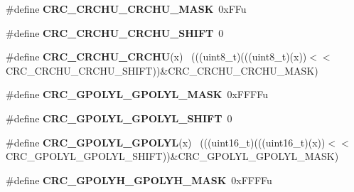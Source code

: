 \begin{DoxyCompactItemize}
\item 
\hypertarget{group___c_r_c___register___masks_ga60c0e02d3f331ed438bce87051649186}{}\#define {\bfseries C\+R\+C\+\_\+\+C\+R\+C\+H\+U\+\_\+\+C\+R\+C\+H\+U\+\_\+\+M\+A\+S\+K}~0x\+F\+Fu\label{group___c_r_c___register___masks_ga60c0e02d3f331ed438bce87051649186}

\item 
\hypertarget{group___c_r_c___register___masks_ga90800aefc9bc2279fa16af913bbbc634}{}\#define {\bfseries C\+R\+C\+\_\+\+C\+R\+C\+H\+U\+\_\+\+C\+R\+C\+H\+U\+\_\+\+S\+H\+I\+F\+T}~0\label{group___c_r_c___register___masks_ga90800aefc9bc2279fa16af913bbbc634}

\item 
\hypertarget{group___c_r_c___register___masks_gaf83d7187cc7e7ec0ed0df685c6370a08}{}\#define {\bfseries C\+R\+C\+\_\+\+C\+R\+C\+H\+U\+\_\+\+C\+R\+C\+H\+U}(x)                                          ~(((uint8\+\_\+t)(((uint8\+\_\+t)(x))$<$$<$C\+R\+C\+\_\+\+C\+R\+C\+H\+U\+\_\+\+C\+R\+C\+H\+U\+\_\+\+S\+H\+I\+F\+T))\&C\+R\+C\+\_\+\+C\+R\+C\+H\+U\+\_\+\+C\+R\+C\+H\+U\+\_\+\+M\+A\+S\+K)\label{group___c_r_c___register___masks_gaf83d7187cc7e7ec0ed0df685c6370a08}

\item 
\hypertarget{group___c_r_c___register___masks_ga7512a0f84b048e7a54207f9a7e619494}{}\#define {\bfseries C\+R\+C\+\_\+\+G\+P\+O\+L\+Y\+L\+\_\+\+G\+P\+O\+L\+Y\+L\+\_\+\+M\+A\+S\+K}~0x\+F\+F\+F\+Fu\label{group___c_r_c___register___masks_ga7512a0f84b048e7a54207f9a7e619494}

\item 
\hypertarget{group___c_r_c___register___masks_gaf4e5ed1d1478c1a6c8c5681e2b1d24aa}{}\#define {\bfseries C\+R\+C\+\_\+\+G\+P\+O\+L\+Y\+L\+\_\+\+G\+P\+O\+L\+Y\+L\+\_\+\+S\+H\+I\+F\+T}~0\label{group___c_r_c___register___masks_gaf4e5ed1d1478c1a6c8c5681e2b1d24aa}

\item 
\hypertarget{group___c_r_c___register___masks_ga9c1eb3a492719fa1461f3bc3d2593462}{}\#define {\bfseries C\+R\+C\+\_\+\+G\+P\+O\+L\+Y\+L\+\_\+\+G\+P\+O\+L\+Y\+L}(x)                                      ~(((uint16\+\_\+t)(((uint16\+\_\+t)(x))$<$$<$C\+R\+C\+\_\+\+G\+P\+O\+L\+Y\+L\+\_\+\+G\+P\+O\+L\+Y\+L\+\_\+\+S\+H\+I\+F\+T))\&C\+R\+C\+\_\+\+G\+P\+O\+L\+Y\+L\+\_\+\+G\+P\+O\+L\+Y\+L\+\_\+\+M\+A\+S\+K)\label{group___c_r_c___register___masks_ga9c1eb3a492719fa1461f3bc3d2593462}

\item 
\hypertarget{group___c_r_c___register___masks_ga15ab1d296a857eebfbb3e5894ddd9302}{}\#define {\bfseries C\+R\+C\+\_\+\+G\+P\+O\+L\+Y\+H\+\_\+\+G\+P\+O\+L\+Y\+H\+\_\+\+M\+A\+S\+K}~0x\+F\+F\+F\+Fu\label{group___c_r_c___register___masks_ga15ab1d296a857eebfbb3e5894ddd9302}


\end{DoxyCompactItemize}
